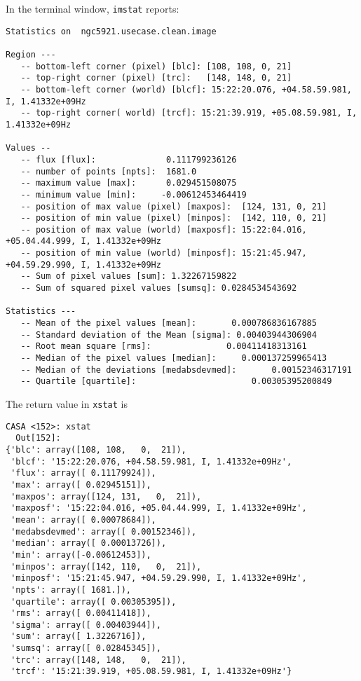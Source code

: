 In the terminal window, {\tt imstat} reports:
\small
\begin{verbatim}
Statistics on  ngc5921.usecase.clean.image

Region ---
   -- bottom-left corner (pixel) [blc]: [108, 108, 0, 21]
   -- top-right corner (pixel) [trc]:   [148, 148, 0, 21]
   -- bottom-left corner (world) [blcf]: 15:22:20.076, +04.58.59.981, I, 1.41332e+09Hz
   -- top-right corner( world) [trcf]: 15:21:39.919, +05.08.59.981, I, 1.41332e+09Hz

Values --
   -- flux [flux]:              0.111799236126
   -- number of points [npts]:  1681.0
   -- maximum value [max]:      0.029451508075
   -- minimum value [min]:     -0.00612453464419
   -- position of max value (pixel) [maxpos]:  [124, 131, 0, 21]
   -- position of min value (pixel) [minpos]:  [142, 110, 0, 21]
   -- position of max value (world) [maxposf]: 15:22:04.016, +05.04.44.999, I, 1.41332e+09Hz
   -- position of min value (world) [minposf]: 15:21:45.947, +04.59.29.990, I, 1.41332e+09Hz
   -- Sum of pixel values [sum]: 1.32267159822
   -- Sum of squared pixel values [sumsq]: 0.0284534543692
   
Statistics ---
   -- Mean of the pixel values [mean]:       0.000786836167885
   -- Standard deviation of the Mean [sigma]: 0.00403944306904
   -- Root mean square [rms]:               0.00411418313161
   -- Median of the pixel values [median]:     0.000137259965413
   -- Median of the deviations [medabsdevmed]:       0.00152346317191
   -- Quartile [quartile]:                       0.00305395200849

\end{verbatim}
\normalsize
The return value in {\tt xstat} is
\small
\begin{verbatim}
CASA <152>: xstat
  Out[152]: 
{'blc': array([108, 108,   0,  21]),
 'blcf': '15:22:20.076, +04.58.59.981, I, 1.41332e+09Hz',
 'flux': array([ 0.11179924]),
 'max': array([ 0.02945151]),
 'maxpos': array([124, 131,   0,  21]),
 'maxposf': '15:22:04.016, +05.04.44.999, I, 1.41332e+09Hz',
 'mean': array([ 0.00078684]),
 'medabsdevmed': array([ 0.00152346]),
 'median': array([ 0.00013726]),
 'min': array([-0.00612453]),
 'minpos': array([142, 110,   0,  21]),
 'minposf': '15:21:45.947, +04.59.29.990, I, 1.41332e+09Hz',
 'npts': array([ 1681.]),
 'quartile': array([ 0.00305395]),
 'rms': array([ 0.00411418]),
 'sigma': array([ 0.00403944]),
 'sum': array([ 1.3226716]),
 'sumsq': array([ 0.02845345]),
 'trc': array([148, 148,   0,  21]),
 'trcf': '15:21:39.919, +05.08.59.981, I, 1.41332e+09Hz'}
\end{verbatim}
\normalsize

